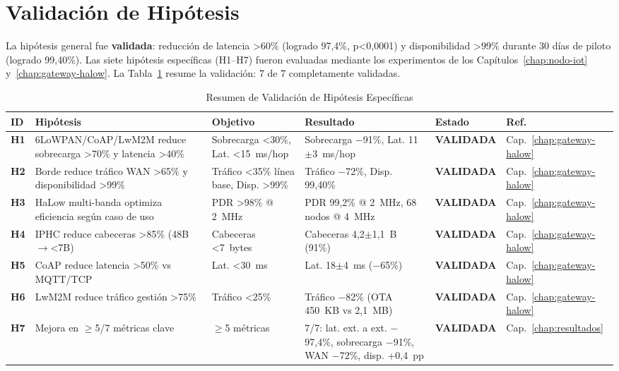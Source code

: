 \section{Validación de Hipótesis}

La hipótesis general fue \textbf{validada}: reducción de latencia >60\% (logrado 97,4\%, p<0,0001) y disponibilidad >99\% durante 30 días de piloto (logrado 99,40\%). Las siete hipótesis específicas (H1--H7) fueron evaluadas mediante los experimentos de los Capítulos~\ref{chap:nodo-iot} y~\ref{chap:gateway-halow}. La Tabla~\ref{tab:hipotesis-validacion} resume la validación: 7 de 7 completamente validadas.

\begin{table}[h]
\centering
\caption{Resumen de Validación de Hipótesis Específicas}
\label{tab:hipotesis-validacion}
\begin{tabular}{|p{1cm}|p{3.5cm}|p{2.5cm}|p{2.5cm}|p{2cm}|p{1.5cm}|}
\hline
\textbf{ID} & \textbf{Hipótesis} & \textbf{Objetivo} & \textbf{Resultado} & \textbf{Estado} & \textbf{Ref.} \\
\hline
\textbf{H1} & 6LoWPAN/CoAP/LwM2M reduce sobrecarga >70\% y latencia >40\% & Sobrecarga <30\%, Lat. <15~ms/hop & Sobrecarga $-$91\%, Lat. 11$\pm$3~ms/hop & \textbf{VALIDADA} & Cap.~\ref{chap:gateway-halow} \\
\hline
\textbf{H2} & Borde reduce tráfico WAN >65\% y disponibilidad >99\% & Tráfico <35\% línea base, Disp. >99\% & Tráfico $-$72\%, Disp. 99,40\% & \textbf{VALIDADA} & Cap.~\ref{chap:gateway-halow} \\
\hline
\textbf{H3} & HaLow multi-banda optimiza eficiencia según caso de uso & PDR >98\% @ 2~MHz & PDR 99,2\% @ 2~MHz, 68 nodos @ 4~MHz & \textbf{VALIDADA} & Cap.~\ref{chap:gateway-halow} \\
\hline
\textbf{H4} & IPHC reduce cabeceras >85\% (48B$\rightarrow$<7B) & Cabeceras <7~bytes & Cabeceras 4,2$\pm$1,1~B (91\%) & \textbf{VALIDADA} & Cap.~\ref{chap:gateway-halow} \\
\hline
\textbf{H5} & CoAP reduce latencia >50\% vs MQTT/TCP & Lat. <30~ms & Lat. 18$\pm$4~ms ($-$65\%) & \textbf{VALIDADA} & Cap.~\ref{chap:gateway-halow} \\
\hline
\textbf{H6} & LwM2M reduce tráfico gestión >75\% & Tráfico <25\% & Tráfico $-$82\% (OTA 450~KB vs 2,1~MB) & \textbf{VALIDADA} & Cap.~\ref{chap:gateway-halow} \\
\hline
\textbf{H7} & Mejora en $\geq$5/7 métricas clave & $\geq$5 métricas & 7/7: lat. ext. a ext. $-$97,4\%, sobrecarga $-$91\%, WAN $-$72\%, disp. +0,4~pp & \textbf{VALIDADA} & Cap.~\ref{chap:resultados} \\
\hline
\end{tabular}
\end{table}

